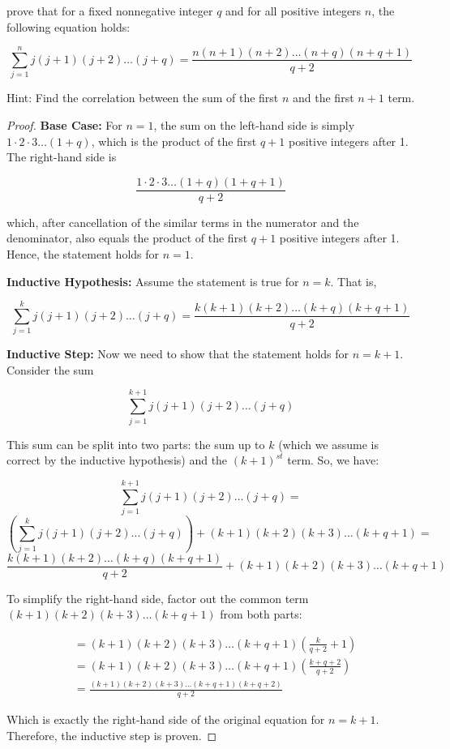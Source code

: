 \documentclass[
	12pt, %
	fleqn, %
	a4paper, %
]{LegrandOrangeBook}
\begin{document}
\begin{exercise}
    prove that for a fixed nonnegative integer \( q \) and for all positive integers \( n \), the following equation holds:

\[ \sum_{j=1}^{n} j(j+1)(j+2)\ldots(j+q) = \frac{n(n+1)(n+2)\ldots(n+q)(n+q+1)}{q+2} \]
\end{exercise}
Hint: Find the correlation between the sum of the first $n$ and the first $n+1$ term.
\begin{proof}
\textbf{Base Case:}
For \( n = 1 \), the sum on the left-hand side is simply \( 1 \cdot 2 \cdot 3 \ldots (1+q) \), which is the product of the first \( q+1 \) positive integers after 1. The right-hand side is

\[ \frac{1 \cdot 2 \cdot 3 \ldots (1+q)(1+q+1)}{q+2} \]

which, after cancellation of the similar terms in the numerator and the denominator, also equals the product of the first \( q+1 \) positive integers after 1. Hence, the statement holds for \( n = 1 \).

\textbf{Inductive Hypothesis:}
Assume the statement is true for \( n = k \). That is,

\[ \sum_{j=1}^{k} j(j+1)(j+2)\ldots(j+q) = \frac{k(k+1)(k+2)\ldots(k+q)(k+q+1)}{q+2} \]

\textbf{Inductive Step:}
Now we need to show that the statement holds for \( n = k+1 \). Consider the sum

\[ \sum_{j=1}^{k+1} j(j+1)(j+2)\ldots(j+q) \]

This sum can be split into two parts: the sum up to \( k \) (which we assume is correct by the inductive hypothesis) and the \( (k+1)^{st} \) term. So, we have:

$$\sum_{j=1}^{k+1} j(j+1)(j+2)\ldots(j+q) =$$
$$\left( \sum_{j=1}^{k} j(j+1)(j+2)\ldots(j+q) \right) + (k+1)(k+2)(k+3)\ldots(k+q+1) =$$ 
$$\frac{k(k+1)(k+2)\ldots(k+q)(k+q+1)}{q+2} + (k+1)(k+2)(k+3)\ldots(k+q+1)$$



To simplify the right-hand side, factor out the common term \( (k+1)(k+2)(k+3)\ldots(k+q+1) \) from both parts:

\begin{align*}
&= (k+1)(k+2)(k+3)\ldots(k+q+1) \left( \frac{k}{q+2} + 1 \right) \\
&= (k+1)(k+2)(k+3)\ldots(k+q+1) \left( \frac{k + q + 2}{q+2} \right) \\
&= \frac{(k+1)(k+2)(k+3)\ldots(k+q+1)(k+q+2)}{q+2}
\end{align*}

Which is exactly the right-hand side of the original equation for \( n = k+1 \). Therefore, the inductive step is proven.

\end{proof}
\end{document}

